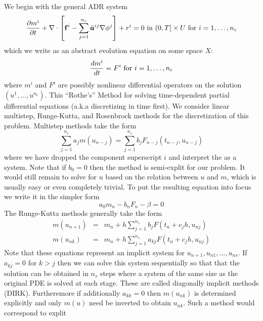 \documentclass[10pt,dvips,twoside,reqno]{amsart}
\begin{document}
We begin with the general ADR system
\begin{equation}
  \label{eq:nladrsysImp}
  \frac{\partial {m^i}}{\partial {t}} + \nabla \cdot \left[ {\bf f}^i - \sum_{j=1}^{n_c} \bar{\mbox{{\boldmath ${a}$}}}^{ij} \nabla \phi^j \right] + r^i = 0 \mbox{ in } (0,T] \times U \mbox{ for } i=1,\ldots, n_c
\end{equation}
which we write as an abstract evolution equation on some space $X$:
\begin{equation}
  \label{eq:abstractEvolve}
  \frac{d {m^i}}{d {t}} = F^i \mbox{ for } i=1,\ldots, n_c
\end{equation}
where $m^i$ and $F^i$ are possibly nonlinear differential operators on
the solution $(u^1,\ldots,u^{n_c})$. This ``Rothe's'' Method for
solving time-dependent partial differential equations (a.k.a
discretizing in time first).  We consider linear multistep,
Runge-Kutta, and Rosenbrock methods for the discretization of this
problem.  Multistep methods take the form
\begin{equation}
  \label{eq:multistep}
  \sum_{j=1}^{n_s} a_j m(u_{n-j}) = \sum_{j=1}^{n_s} b_j F_{n-j}(t_{n-j},u_{n-j})
\end{equation}
where we have dropped the component superscript $i$ and interpret the
 as a system. Note that if $b_0 = 0$ then the method is
semi-explit for our problem. It would still remain to solve for $u$
based on the relation between $u$ and $m$, which is usually easy or
even completely trivial. To put the resulting equation into focus we write it in the simpler form
\begin{equation}
  \label{eq:multistepReduced}
  a_0 m_n - b_n F_n - \beta = 0
\end{equation}
The Runge-Kutta methods generally take the form
\begin{eqnarray}
  \label{eq:rungeKutta}
  m(u_{n+1}) &=& m_n + h \sum_{j=1}^{n_s} b_j F(t_n + c_j h,u_{nj}) \\
  m(u_{nk})  &=& m_n + h \sum_{j=1}^{n_s} a_{kj} F(t_n + c_j h,u_{nj}) 
\end{eqnarray}
Note that these equations represent an implicit system for
$u_{n+1},u_{n1},\ldots, u_{ns}$. If $a_{kj} = 0$ for $k>j$ then we can
solve this system sequentially so that that the solution can be
obtained in $n_s$ steps where a system of the same size as the
original PDE is solved at each stage. These are called diagonally
implicit methods (DIRK). Furtheremore if additionally $a_{kk} = 0$
then $m(u_{nk})$ is determined explicitly and only $m(u)$ need be
inverted to obtain $u_{nk}$. Such a method would correspond to explit
\end{document}
